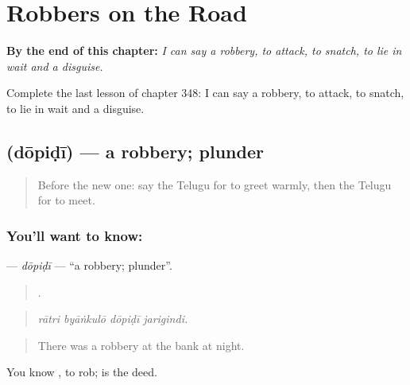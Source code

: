
\chapter{Robbers on the Road}
\label{ch:te-robbers-on-the-road}

\begin{chapteropening}
\textbf{By the end of this chapter:} \emph{I can say a robbery, to attack, to snatch, to lie in wait and a disguise.}

Complete the last lesson of chapter 348: I can say a robbery, to attack, to snatch, to lie in wait and a disguise.
\end{chapteropening}

\section[\texorpdfstring{\te{దోపిడీ} (dōpiḍī)}{దోపిడీ (dōpiḍī)}]{ (dōpiḍī) — a robbery; plunder}

\label{lesson:TE-C348-dopidi}



\begin{quote}
Before the new one: say the Telugu for to greet warmly, then the Telugu for to meet.
\end{quote}

\subsection*{You'll want to know: }
\textbf{} — \emph{dōpiḍī} — \textquotedblleft{}a robbery; plunder\textquotedblright{}.

\begin{quote}
   .
\end{quote}

\begin{quote}
\emph{rātri byāṅkulō dōpiḍī jarigindi.}
\end{quote}

\begin{quote}
There was a robbery at the bank at night.
\end{quote}

You know , to rob;  is the deed.

